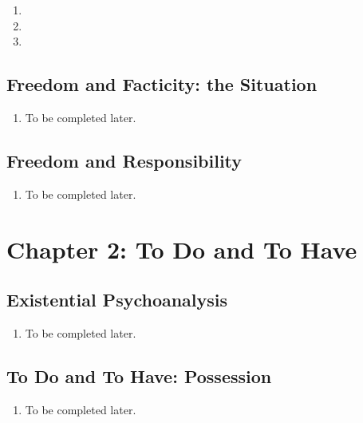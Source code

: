 \begin{enumerate}
  \item {}
  \item {}
  \item {}
\end{enumerate}

\subsection{Freedom and Facticity: the Situation}

\begin{enumerate}
  \item To be completed later.
\end{enumerate}

\subsection{Freedom and Responsibility}

\begin{enumerate}
  \item To be completed later.
\end{enumerate}

\section{Chapter 2: To Do and To Have}

\subsection{Existential Psychoanalysis}

\begin{enumerate}
  \item To be completed later.
\end{enumerate}

\subsection{To Do and To Have: Possession}

\begin{enumerate}
  \item To be completed later.
\end{enumerate}

